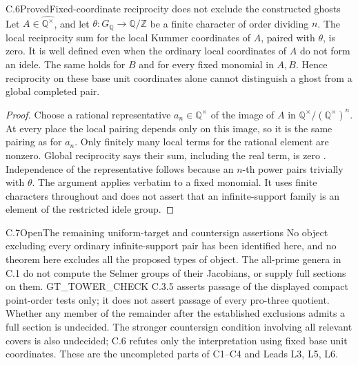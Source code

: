 \begin{result}{C.6}{Proved}{Fixed-coordinate reciprocity does not exclude the constructed ghosts}
Let \(A\in\widehat{\mathbb Q^\times}\), and let
\(\theta:G_{\mathbb Q}\to\mathbb Q/\mathbb Z\) be a finite
character of order dividing \(n\). The local reciprocity sum for the
local Kummer coordinates of \(A\), paired with \(\theta\), is zero.
It is well defined even when the ordinary local coordinates of \(A\)
do not form an idele. The same holds for \(B\) and for every fixed
monomial in \(A,B\). Hence reciprocity on these base unit coordinates
alone cannot distinguish a ghost from a global completed pair.
\end{result}
\begin{proof}
Choose a rational representative \(a_n\in\mathbb Q^\times\) of
the image of \(A\) in \(\mathbb Q^\times/(\mathbb Q^\times)^n\).
At every place the local pairing depends only on this image, so it is
the same pairing as for \(a_n\). Only finitely many local terms for
the rational element are nonzero. Global reciprocity says their sum,
including the real term, is zero
\citep[VII, Theorem 8.1, p.~221]{RootMilneCFT}. Independence of the representative
follows because an \(n\)-th power pairs trivially with \(\theta\).
The argument applies verbatim to a fixed monomial. It uses finite
characters throughout and does not assert that an infinite-support
family is an element of the restricted idele group.
\end{proof}

\begin{result}{C.7}{Open}{The remaining uniform-target and countersign assertions}
No object excluding every ordinary infinite-support pair has been
identified here, and no theorem here excludes all the proposed types of
object. The all-prime genera in C.1 do not compute the Selmer groups of
their Jacobians, or supply full sections on them. GT\_TOWER\_CHECK
C.3.5 asserts passage of the displayed compact point-order tests only;
it does not assert passage of every pro-three quotient. Whether any member of the remainder after the established exclusions
admits a full section is undecided.
The stronger countersign condition involving all relevant covers is
also undecided; C.6 refutes only the interpretation using fixed base
unit coordinates. These are the uncompleted parts of C1--C4 and
Leads L3, L5, L6.
\end{result}

